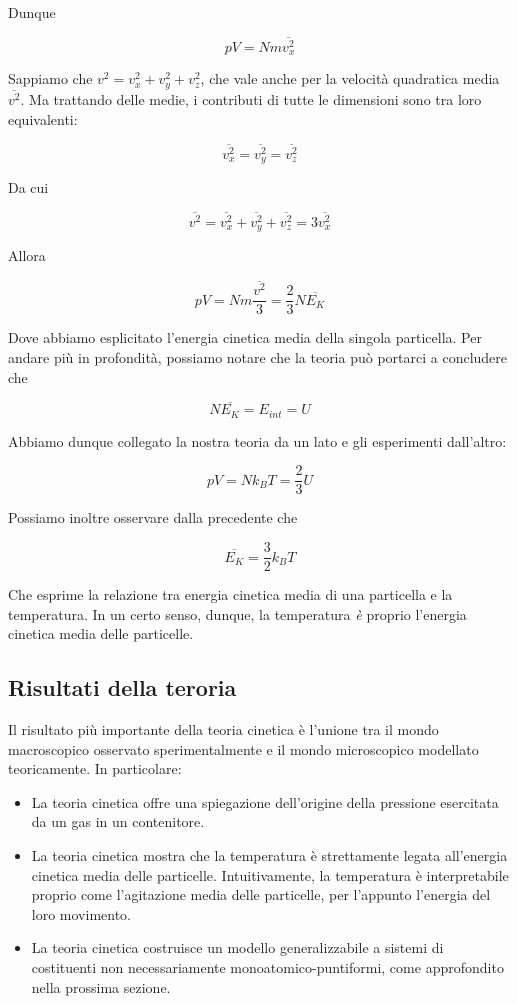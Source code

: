 Dunque

\[ pV = Nm\overline{v_x^2} \]

Sappiamo che $v^2 = v_x^2 + v_y^2 + v_z^2$, che vale anche per la
velocità quadratica media $\overline{v^2}$. Ma trattando delle medie,
i contributi di tutte le dimensioni sono tra loro equivalenti:

\[ \overline{v_x^2} = \overline{v_y^2} = \overline{v_z^2} \]

Da cui

\[ \overline{v^2} = \overline{v_x^2} + \overline{v_y^2} + \overline{v_z^2} = 3\overline{v_x^2} \]

Allora

\[ pV = Nm\frac{\overline{v^2}}{3} = \frac{2}{3}N\overline{E_K}\]

Dove abbiamo esplicitato l'energia cinetica media della singola particella.
Per andare più in profondità, possiamo notare che la teoria può
portarci a concludere che

\[ N\overline{E_K} = E_{int} = U \]

Abbiamo dunque collegato la nostra teoria da un lato e gli esperimenti
dall'altro:

\[ pV = Nk_BT = \frac{2}{3}U \]

Possiamo inoltre osservare dalla precedente che

\[ \overline{E_K} = \frac{3}{2}k_BT \]

Che esprime la relazione tra energia cinetica media di una particella
e la temperatura. In un certo senso, dunque, la temperatura \textit{è}
proprio l'energia cinetica media delle particelle.

\subsection*{Risultati della teroria}
Il risultato più importante della teoria cinetica è l'unione tra
il mondo macroscopico osservato sperimentalmente e il mondo microscopico
modellato teoricamente. In particolare:
\begin{itemize}
    \item La teoria cinetica offre una spiegazione dell'origine della
    pressione esercitata da un gas in un contenitore.

    \item La teoria cinetica mostra che la temperatura è strettamente
    legata all'energia cinetica media delle particelle. Intuitivamente,
    la temperatura è interpretabile proprio come l'agitazione media
    delle particelle, per l'appunto l'energia del loro movimento.

    \item La teoria cinetica costruisce un modello generalizzabile
    a sistemi di costituenti non necessariamente monoatomico-puntiformi,
    come approfondito nella prossima sezione.
\end{itemize}

